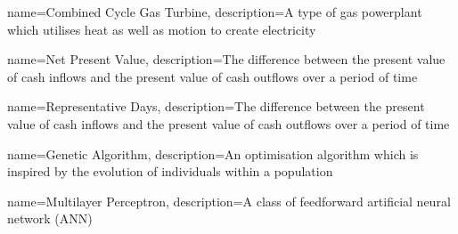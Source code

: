 {
	name=Combined Cycle Gas Turbine,
	description={A type of gas powerplant which utilises heat as well as motion to create electricity}
}




{
	name=Net Present Value,
	description={The difference between the present value of cash inflows and the present value of cash outflows over a period of time}
}



{
	name=Representative Days,
	description={The difference between the present value of cash inflows and the present value of cash outflows over a period of time}
}


{
	name=Genetic Algorithm,
	description={An optimisation algorithm which is inspired by the evolution of individuals within a population}
}




{
	name=Multilayer Perceptron,
	description={A class of feedforward artificial neural network (ANN)}
}












